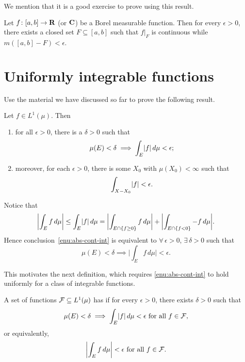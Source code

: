 We mention that it is a good exercise to prove  using this result.
\begin{namedthm}
    Let $f\colon [a,b] \to \mathbf{R}$ (or $\mathbf{C}$) be a Borel measurable function. Then for every $\epsilon >0$, there exists a closed set $F \subseteq [a,b]$ such that $f|_F$ is continuous while $m([a,b] - F) < \epsilon$.
\end{namedthm}

\section{Uniformly integrable functions}

Use the material we have discussed so far to prove the following result.
\begin{xca} \label{xca:abs-cont-int-motiv}
Let $f \in L^1(\mu)$. Then
\begin{enumerate}
    \item \label{enu:abs-cont-int}for all $\epsilon > 0$, there is a $\delta > 0$ such that \[
    \mu(E) < \delta \implies \int_E \lvert f \rvert \,d\mu < \epsilon;
\]
    \item moreover, for each $\epsilon > 0$, there is some $X_0$ with $\mu(X_0) < \infty$ such that \[
    \int_{X - X_0} \lvert f \rvert < \epsilon.
\]
\end{enumerate}
\end{xca}

Notice that \[
    \biggl\vert\int_E f \,d\mu \biggr\vert \leq \int_E \lvert f \rvert \,d\mu = \biggl\vert\int_{E \cap \{f \geq 0\}} f\,d\mu\biggr\vert + \biggl\vert\int_{E \cap \{f < 0\}} -f \,d\mu\biggr\vert.\]
Hence conclusion~\ref{enu:abs-cont-int} is equivalent to $\forall\,\epsilon > 0$, $\exists\, \delta > 0$ such that \[
    \mu(E) < \delta \implies \biggl\vert\int_E f \,d\mu\biggr\vert <\epsilon.
\]

This motivates the next definition, which requires \ref{enu:abs-cont-int} to hold uniformly for a class of integrable functions.

\begin{defn}
    A set of functions $\mathcal{F} \subseteq L^1(\mu)$ has  if for every $\epsilon > 0$, there exists $\delta > 0$ such that \[
        \mu(E) < \delta \implies \int_E \lvert f \rvert \,d\mu <\epsilon \text{ for all $f \in \mathcal{F}$},
    \] or equivalently, \[ \biggl\vert\int_E f \,d\mu\biggr\vert <\epsilon \text{ for all $f \in \mathcal{F}$}.
    \]
\end{defn}

